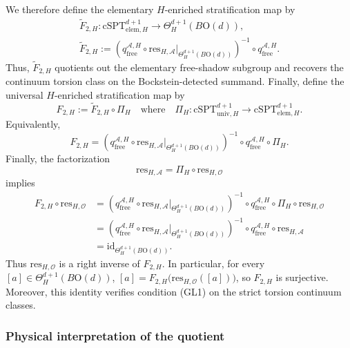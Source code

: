 \documentclass[aps,prx,reprint,superscriptaddress,twocolumn,amsmath,amssymb,amsfonts, nofootinbib]{revtex4-2}
\newcommand{\res}{\text{res}}
\theoremstyle{apsstyle}
\begin{document}
We therefore define the elementary $H$-enriched stratification map by
\begin{gather}
\nonumber
\widetilde F_{2,H} : \mathrm{cSPT}^{d+1}_{\mathrm{elem},H}\to \Theta^{d+1}_{H}(B\mathrm{O}(d)),\\
\widetilde F_{2,H} :=
\left( q_{\mathrm{free}}^{\mathcal A,H} \circ
\res_{H,\mathcal A} \big|_{\Theta^{d+1}_{H}(B\mathrm{O}(d))} \right)^{-1}
\circ q_{\mathrm{free}}^{\mathcal A,H}.
\label{eq:widetilde_F_2H}
\end{gather}
Thus, $\widetilde F_{2,H}$ quotients out the elementary free-shadow subgroup and recovers the continuum torsion class on the Bockstein-detected summand. Finally, define the universal $H$-enriched stratification map by 
\begin{equation*}
F_{2,H} := \widetilde F_{2,H}\circ \Pi_H\quad \text{where}\quad \Pi_{H}: \mathrm{cSPT}^{d+1}_{\mathrm{univ},H}\to \mathrm{cSPT}^{d+1}_{\mathrm{elem},H}.
\end{equation*}
Equivalently,
\begin{equation}
F_{2,H} = \left( q_{\mathrm{free}}^{\mathcal A,H} \circ \res_{H,\mathcal A} \big|_{\Theta^{d+1}_{H}(B\mathrm{O}(d))} \right)^{-1} \circ q_{\mathrm{free}}^{\mathcal A,H}
\circ \Pi_H.
\label{eq:F_2H}
\end{equation}
Finally, the factorization
\begin{equation*}
\res_{H,\mathcal A} = \Pi_H\circ\res_{H,\mathcal O}
\end{equation*}
implies
\begin{align*}
F_{2,H}\circ\res_{H,\mathcal O} &=
\left( q_{\mathrm{free}}^{\mathcal A,H} \circ \res_{H,\mathcal A}
\big|_{\Theta^{d+1}_{H}(B\mathrm{O}(d))} \right)^{-1} \circ
q_{\mathrm{free}}^{\mathcal A,H}
\circ \Pi_H \circ \res_{H,\mathcal O}
\\
&= \left( q_{\mathrm{free}}^{\mathcal A,H} \circ \res_{H,\mathcal A}
\big|_{\Theta^{d+1}_{H}(B\mathrm{O}(d))} \right)^{-1} \circ q_{\mathrm{free}}^{\mathcal A,H} \circ \res_{H,\mathcal A}
\\
&= \mathrm{id}_{\Theta^{d+1}_{H}(B\mathrm{O}(d))}.
\end{align*}
Thus $\res_{H,\mathcal O}$ is a right inverse of $F_{2,H}$. In
particular, for every $[a]\in\Theta^{d+1}_{H}(B\mathrm{O}(d))$, $[a] = F_{2,H}\bigl(\res_{H,\mathcal O}([a])\bigr)$, so $F_{2,H}$ is surjective. Moreover, this identity verifies condition {\rm(GL1)} on the strict torsion continuum classes.

\subsubsection{Physical interpretation of the quotient} 
\label{sec:phys_int_of_quot}
\end{document}
